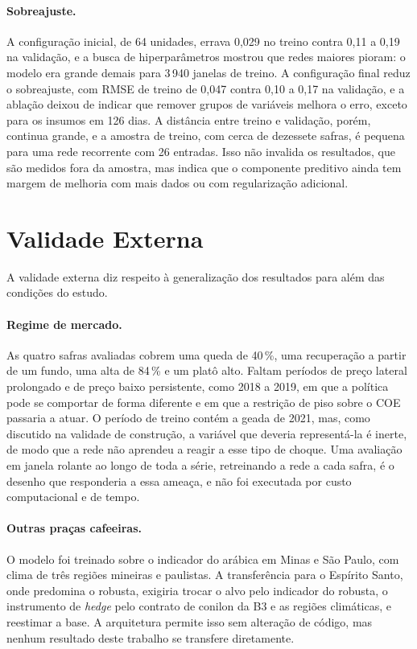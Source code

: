\paragraph{Sobreajuste.} A configuração inicial, de 64 unidades, errava 0,029 no treino contra 0,11 a 0,19 na validação, e a busca de hiperparâmetros mostrou que redes maiores pioram: o modelo era grande demais para 3\,940 janelas de treino. A configuração final reduz o sobreajuste, com RMSE de treino de 0,047 contra 0,10 a 0,17 na validação, e a ablação deixou de indicar que remover grupos de variáveis melhora o erro, exceto para os insumos em 126 dias. A distância entre treino e validação, porém, continua grande, e a amostra de treino, com cerca de dezessete safras, é pequena para uma rede recorrente com 26 entradas. Isso não invalida os resultados, que são medidos fora da amostra, mas indica que o componente preditivo ainda tem margem de melhoria com mais dados ou com regularização adicional.

\section{Validade Externa}\label{sec2:amc-externa}

A validade externa diz respeito à generalização dos resultados para além das condições do estudo.

\paragraph{Regime de mercado.} As quatro safras avaliadas cobrem uma queda de 40\,\%, uma recuperação a partir de um fundo, uma alta de 84\,\% e um platô alto. Faltam períodos de preço lateral prolongado e de preço baixo persistente, como 2018 a 2019, em que a política pode se comportar de forma diferente e em que a restrição de piso sobre o COE passaria a atuar. O período de treino contém a geada de 2021, mas, como discutido na validade de construção, a variável que deveria representá-la é inerte, de modo que a rede não aprendeu a reagir a esse tipo de choque. Uma avaliação em janela rolante ao longo de toda a série, retreinando a rede a cada safra, é o desenho que responderia a essa ameaça, e não foi executada por custo computacional e de tempo.

\paragraph{Outras praças cafeeiras.} O modelo foi treinado sobre o indicador do arábica em Minas e São Paulo, com clima de três regiões mineiras e paulistas. A transferência para o Espírito Santo, onde predomina o robusta, exigiria trocar o alvo pelo indicador do robusta, o instrumento de \textit{hedge} pelo contrato de conilon da B3 e as regiões climáticas, e reestimar a base. A arquitetura permite isso sem alteração de código, mas nenhum resultado deste trabalho se transfere diretamente.

